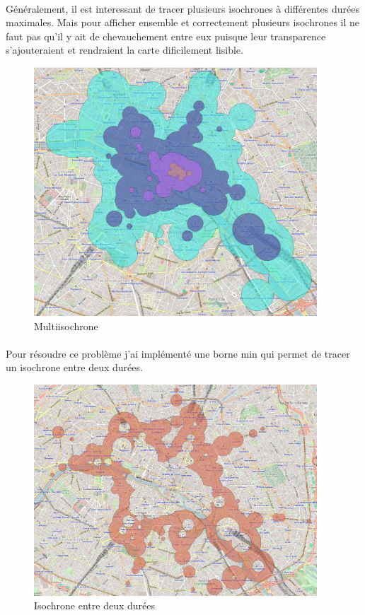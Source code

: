 \documentclass[a4paper]{report}
\begin{document}
\paragraph{} Généralement, il est interessant de tracer plusieurs isochrones à différentes durées maximales. Mais pour afficher ensemble et correctement plusieurs isochrones il ne faut pas qu'il y ait de chevauchement entre eux puisque leur transparence s'ajouteraient et rendraient la carte dificilement lisible.

\begin{figure}[H]
	\begin{center}
		\includegraphics[width=300pt]{image/multi_iso}
		\caption{Multiisochrone}
		\label{Multiisocrone}
	\end{center}	
\end{figure}

\paragraph{} Pour résoudre ce problème j'ai implémenté une borne min qui permet de tracer un isochrone entre deux durées. 

\begin{figure}[H]
	\begin{center}
		\includegraphics[width=300pt]{image/iso_min}
		\caption{Isochrone entre deux durées}
		\label{Isochrone entre deux durées}
	\end{center}	
\end{figure}
\end{document}
